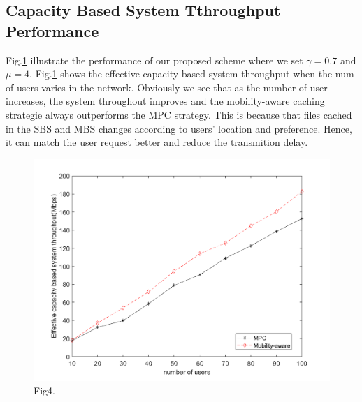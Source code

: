 \documentclass[conference]{IEEEtran}
\begin{document}
\subsection{Capacity Based System Tthroughput Performance}
Fig.\ref{fig 4} illustrate the performance of our proposed scheme where we set $\gamma=0.7$ and $\mu=4$. Fig.\ref{fig 4} shows the effective capacity based system throughput when the num of users varies in the network. Obviously we see that as the number of user increases, the system throughout improves and the mobility-aware caching strategie always outperforms the MPC strategy. This is because that files cached in the SBS and MBS changes according to users’ location and preference. Hence, it can match the user request better and reduce the transmition delay.
\begin{figure}[htbp]
 \centerline{\includegraphics[scale=0.35]{fig4.png}}
 \caption{Fig4.}
 \label{fig 4}
\end{figure}
\end{document}
